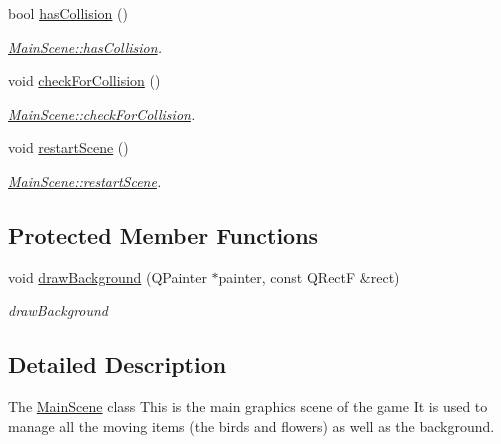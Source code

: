 \begin{DoxyCompactItemize}
bool \hyperlink{class_main_scene_a4b2d78977f11b426c324f66277546360}{has\+Collision} ()
\begin{DoxyCompactList}\small\item\em \hyperlink{class_main_scene_a4b2d78977f11b426c324f66277546360}{Main\+Scene\+::has\+Collision}. \end{DoxyCompactList}\item 
void \hyperlink{class_main_scene_a415d733af1f33b9af9f94042083472aa}{check\+For\+Collision} ()
\begin{DoxyCompactList}\small\item\em \hyperlink{class_main_scene_a415d733af1f33b9af9f94042083472aa}{Main\+Scene\+::check\+For\+Collision}. \end{DoxyCompactList}\item 
\hypertarget{class_main_scene_ab5f3fb8e1e0b77b63231ea976fe1eb25}{}void \hyperlink{class_main_scene_ab5f3fb8e1e0b77b63231ea976fe1eb25}{restart\+Scene} ()\label{class_main_scene_ab5f3fb8e1e0b77b63231ea976fe1eb25}

\begin{DoxyCompactList}\small\item\em \hyperlink{class_main_scene_ab5f3fb8e1e0b77b63231ea976fe1eb25}{Main\+Scene\+::restart\+Scene}. \end{DoxyCompactList}\end{DoxyCompactItemize}
\subsection*{Protected Member Functions}
\begin{DoxyCompactItemize}
\item 
void \hyperlink{class_main_scene_a8ba16fde46c54c2fa4098d03c9ffd332}{draw\+Background} (Q\+Painter $\ast$painter, const Q\+Rect\+F \&rect)
\begin{DoxyCompactList}\small\item\em draw\+Background \end{DoxyCompactList}\end{DoxyCompactItemize}


\subsection{Detailed Description}
The \hyperlink{class_main_scene}{Main\+Scene} class This is the main graphics scene of the game It is used to manage all the moving items (the birds and flowers) as well as the background. 

